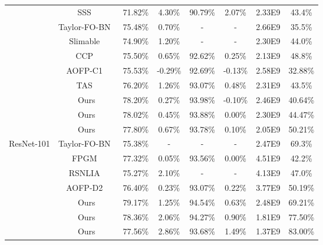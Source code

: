 \documentclass{article}
\begin{document}
\begin{table}[t]
\begin{tabular}{c c c c c c c c}
                          &SSS~\cite{SSS2018} & 71.82\%     & 4.30\%    &  90.79\%     &   2.07\%  &  2.33E9 &   43.4\%   \\
                          & Taylor-FO-BN~\cite{molchanov2019taylor}& 75.48\%     &  0.70\%     & -     &   -   &  2.66E9 &   35.5\%   \\
                          & Slimable~\cite{yu2018slimmable}& 74.90\%     &  1.20\%     & -     &   -   &  2.30E9 &   44.0\%   \\
                          & CCP~\cite{CCP} & 75.50\%     &  0.65\%    &  92.62\%     &   0.25\%   &  2.13E9 &   48.8\% \\
                          & AOFP-C1~\cite{AOFPC1} & 75.53\%     &  -0.29\%    &  92.69\%     &   -0.13\%   &  2.58E9 &   32.88\% \\
                          & TAS~\cite{TAS}    & 76.20\%     &  1.26\%    &  93.07\%     &   0.48\%   &  2.31E9 &   43.5\%   \\\cmidrule[0.5pt](lr){2-8}
                          & Ours  & {78.20\%}   &  {0.27\%}    &  {93.98\%}     &   {-0.10\%}   &  {2.46E9} &   {40.64\%} \\
                          & Ours  & {78.02\%}   &  {0.45\%}    &  {93.88\%}     &   {0.00\%}   &  {2.30E9} &   {44.47\%} \\
                          & Ours  & {77.80\%}   &  {0.67\%}    &  {93.78\%}     &   {0.10\%}   &  {2.05E9} &   {50.21\%} \\

\midrule
\multirow{7}{*}{ResNet-101}

			 & Taylor-FO-BN~\cite{molchanov2019taylor}& 75.38\%     &  -     & -     &   -   &  2.47E9 &   69.3\%   \\
			 & FPGM~\cite{FPGM}& 77.32\%    & 0.05\%    &  93.56\%     &  0.00\%    &  4.51E9 & 42.2\% \\
			 & RSNLIA~\cite{ye2018rethinking}& 75.27\% &  2.10\%    &  -           &     -      &  4.13E9 & 47.0\% \\  
			 & AOFP-D2~\cite{AOFPC1}& 76.40\% &  0.23\%    &  93.07\%        &     0.22\%      &  3.77E9 & 50.19\% \\  
			 \cmidrule[0.5pt](lr){2-8}
			 &Ours                &  {79.17\%}     & 1.25\%   & {94.54\%} & 0.63\%& {2.48E9}&   {69.21\%}            \\
                          &Ours                &  {78.36\%}     & 2.06\%   & {94.27\%} & 0.90\%& {1.81E9}&   {77.50\%}            \\
                          &Ours                &  {77.56\%}     & 2.86\%   & {93.68\%} & 1.49\%& {1.37E9}&   {83.00\%}            \\

    \bottomrule
\end{tabular}
  \label{table:ImageNet-SOTA}
\end{table}
\end{document}
